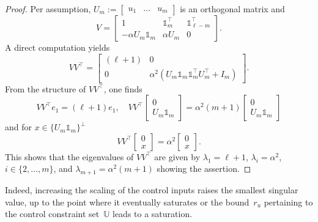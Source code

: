 \documentclass[a4paper, reqno]{amsart}
\newcommand{\dd}{\ell}
\newcommand{\one}{\mathds{1}}
\begin{document}
\begin{proof}
    Per assumption, $U_m:=\begin{bmatrix}
        u_1 & \dots &u_{m}
    \end{bmatrix}$ is an orthogonal matrix and
    \begin{equation}\nonumber
     V=\begin{bmatrix}
         1 & \one_{m}^\top & \one_{\dd-m}^\top\\
         -\alpha U_m\one_m & \alpha U_m & 0
     \end{bmatrix}.
    \end{equation}
    A direct computation yields
    \begin{equation}\nonumber
         VV^\top = \begin{bmatrix}
            (\dd+1) & 0\\0 & \alpha^2 (U_m\one_m \one_m^\top U_m^\top + I_m)
        \end{bmatrix}.
    \end{equation}
    From the structure of $VV^\top\!$, one finds
    \begin{equation}\nonumber
        VV^\top e_1 = (\dd+1)e_1, \quad VV^\top \begin{bmatrix}
            0\\ U_m\one_m
        \end{bmatrix} = \alpha^2(m+1) \begin{bmatrix}
            0\\ U_m\one_m
        \end{bmatrix}
    \end{equation}
    and for $x\in \{U_m\one_m\}^\bot$ 
    \begin{equation}\nonumber
        VV^\top \begin{bmatrix}
            0\\ x
        \end{bmatrix} = \alpha^2 \begin{bmatrix}
            0\\ x
        \end{bmatrix}.
    \end{equation}
    This shows that the eigenvalues of $VV^\top$ are given by $\lambda_1=\dd+1$, $\lambda_i = \alpha^2$, $i \in \{2,\ldots,m\}$, and $\lambda_{m+1} = \alpha^2(m+1)$ showing the assertion.
\end{proof}
Indeed, increasing the scaling of the control inputs raises the smallest singular value, up to the point where it eventually saturates or the bound~$r_u$ pertaining to the control constraint set~$\mathbb{U}$ leads to a saturation.
\end{document}
